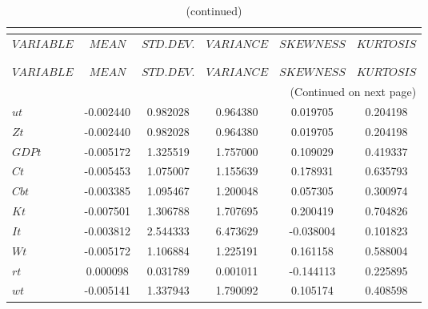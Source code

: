  
\begin{center}
\begin{longtable}{lccccc} 
\caption{MOMENTS OF SIMULATED VARIABLES}\\
 \label{Table:sim_moments}\\
\toprule 
$VARIABLE  $	 & 	 $            MEAN$	 & 	 $       STD. DEV.$	 & 	 $        VARIANCE$	 & 	 $        SKEWNESS$	 & 	 $        KURTOSIS$\\
\midrule \endfirsthead 
\caption{(continued)}\\
 \toprule \\ 
$VARIABLE  $	 & 	 $            MEAN$	 & 	 $       STD. DEV.$	 & 	 $        VARIANCE$	 & 	 $        SKEWNESS$	 & 	 $        KURTOSIS$\\
\midrule \endhead 
\midrule \multicolumn{6}{r}{(Continued on next page)} \\ \bottomrule \endfoot 
\bottomrule \endlastfoot 
$ut        $	 & 	       -0.002440	 & 	        0.982028	 & 	        0.964380	 & 	        0.019705	 & 	        0.204198 \\ 
$Zt        $	 & 	       -0.002440	 & 	        0.982028	 & 	        0.964380	 & 	        0.019705	 & 	        0.204198 \\ 
$GDPt      $	 & 	       -0.005172	 & 	        1.325519	 & 	        1.757000	 & 	        0.109029	 & 	        0.419337 \\ 
$Ct        $	 & 	       -0.005453	 & 	        1.075007	 & 	        1.155639	 & 	        0.178931	 & 	        0.635793 \\ 
$Cbt       $	 & 	       -0.003385	 & 	        1.095467	 & 	        1.200048	 & 	        0.057305	 & 	        0.300974 \\ 
$Kt        $	 & 	       -0.007501	 & 	        1.306788	 & 	        1.707695	 & 	        0.200419	 & 	        0.704826 \\ 
$It        $	 & 	       -0.003812	 & 	        2.544333	 & 	        6.473629	 & 	       -0.038004	 & 	        0.101823 \\ 
$Wt        $	 & 	       -0.005172	 & 	        1.106884	 & 	        1.225191	 & 	        0.161158	 & 	        0.588004 \\ 
$rt        $	 & 	        0.000098	 & 	        0.031789	 & 	        0.001011	 & 	       -0.144113	 & 	        0.225895 \\ 
$wt        $	 & 	       -0.005141	 & 	        1.337943	 & 	        1.790092	 & 	        0.105174	 & 	        0.408598 \\ 

\end{longtable}
\end{center}
